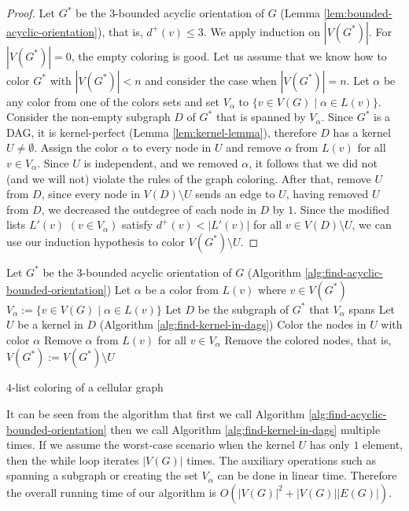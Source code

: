 \documentclass[a4paper, 12pt]{article}
\begin{document}
\begin{proof}
Let $G^*$ be the $3$-bounded acyclic orientation of $G$ (Lemma \ref{lem:bounded-acyclic-orientation}), that is, $d^+(v) \leqslant 3$. We apply induction on $|V(G^*)|$. For $|V(G^*)|=0$, the empty coloring is good. Let us assume that we know how to color $G^*$ with $|V(G^*)| < n$ and consider the case when $|V(G^*)|=n$. Let $\alpha$ be any color from one of the colors sets and set $V_\alpha$ to $\lbrace v \in V(G) \mid \alpha \in L(v) \rbrace$. Consider the non-empty subgraph $D$ of $G^*$ that is spanned by $V_\alpha$. Since $G^*$ is a DAG, it is kernel-perfect (Lemma \ref{lem:kernel-lemma}), therefore $D$ has a kernel $U \neq \emptyset$. Assign the color $\alpha$ to every node in $U$ and remove $\alpha$ from $L(v)$ for all $v \in V_\alpha$. Since $U$ is independent, and we removed $\alpha$, it follows that we did not (and we will not) violate the rules of the graph coloring. After that, remove $U$ from $D$, since every node in $V(D) \setminus U$ sends an edge to $U$, having removed $U$ from $D$, we decreased the outdegree of each node in $D$ by $1$. Since the modified lists $L'(v)$ $(v \in V_\alpha)$ satisfy $d^+(v) < |L'(v)|$ for all $v \in V(D) \setminus U$, we can use our induction hypothesis to color $V(G^*) \setminus U$.
\end{proof}
\begin{algorithm}[h!]\label{alg:four-list-coloring}
  Let $G^*$ be the $3$-bounded acyclic orientation of $G$ (Algorithm \ref{alg:find-acyclic-bounded-orientation})\;
   {
  	Let $\alpha$ be a color from $L(v)$ where $v \in V(G^*)$\;
  	$V_\alpha := \lbrace v \in V(G) \mid \alpha \in L(v) \rbrace$\;
  	Let $D$ be the subgraph of $G^*$ that $V_\alpha$ spans\;
  	Let $U$ be a kernel in $D$ (Algorithm \ref{alg:find-kernel-in-dags})\;
  	Color the nodes in $U$ with color $\alpha$\;
  	Remove $\alpha$ from $L(v)$ for all $v \in V_\alpha$\;
  	Remove the colored nodes, that is, $V(G^*) := V(G^*) \setminus U$\;
  }
 \caption{$4$-list coloring of a cellular graph}
\end{algorithm}

It can be seen from the algorithm that first we call Algorithm \ref{alg:find-acyclic-bounded-orientation} then we call Algorithm \ref{alg:find-kernel-in-dags} multiple times. If we assume the worst-case scenario when the kernel $U$ has only $1$ element, then the while loop iterates $|V(G)|$ times. The auxiliary operations such as spanning a subgraph or creating the set $V_\alpha$ can be done in linear time. Therefore the overall running time of our algorithm is $O(|V(G)|^2+|V(G)||E(G)|)$.
\end{document}
